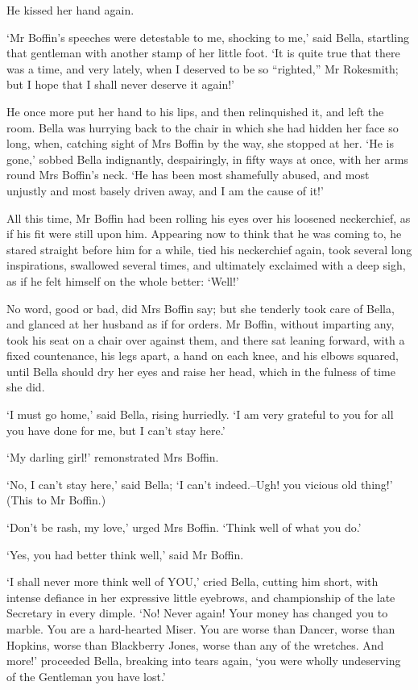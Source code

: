 He kissed her hand again.

‘Mr Boffin’s speeches were detestable to me, shocking to me,’ said
Bella, startling that gentleman with another stamp of her little
foot. ‘It is quite true that there was a time, and very lately, when I
deserved to be so “righted,” Mr Rokesmith; but I hope that I shall never
deserve it again!’

He once more put her hand to his lips, and then relinquished it, and
left the room. Bella was hurrying back to the chair in which she had
hidden her face so long, when, catching sight of Mrs Boffin by the
way, she stopped at her. ‘He is gone,’ sobbed Bella indignantly,
despairingly, in fifty ways at once, with her arms round Mrs Boffin’s
neck. ‘He has been most shamefully abused, and most unjustly and most
basely driven away, and I am the cause of it!’

All this time, Mr Boffin had been rolling his eyes over his loosened
neckerchief, as if his fit were still upon him. Appearing now to think
that he was coming to, he stared straight before him for a while, tied
his neckerchief again, took several long inspirations, swallowed several
times, and ultimately exclaimed with a deep sigh, as if he felt himself
on the whole better: ‘Well!’

No word, good or bad, did Mrs Boffin say; but she tenderly took care of
Bella, and glanced at her husband as if for orders. Mr Boffin, without
imparting any, took his seat on a chair over against them, and there
sat leaning forward, with a fixed countenance, his legs apart, a hand on
each knee, and his elbows squared, until Bella should dry her eyes and
raise her head, which in the fulness of time she did.

‘I must go home,’ said Bella, rising hurriedly. ‘I am very grateful to
you for all you have done for me, but I can’t stay here.’

‘My darling girl!’ remonstrated Mrs Boffin.

‘No, I can’t stay here,’ said Bella; ‘I can’t indeed.--Ugh! you vicious
old thing!’ (This to Mr Boffin.)

‘Don’t be rash, my love,’ urged Mrs Boffin. ‘Think well of what you do.’

‘Yes, you had better think well,’ said Mr Boffin.

‘I shall never more think well of YOU,’ cried Bella, cutting him
short, with intense defiance in her expressive little eyebrows, and
championship of the late Secretary in every dimple. ‘No! Never again!
Your money has changed you to marble. You are a hard-hearted Miser. You
are worse than Dancer, worse than Hopkins, worse than Blackberry Jones,
worse than any of the wretches. And more!’ proceeded Bella, breaking
into tears again, ‘you were wholly undeserving of the Gentleman you have
lost.’

